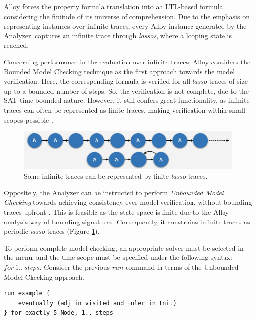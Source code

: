 Alloy forces the property formula translation into an LTL-based formula, considering the finitude of its universe of comprehension. Due to the emphasis on representing instances over infinite traces, every Alloy instance generated by the Analyzer, captures an infinite trace through \textit{lassos}, where a looping state is reached.

Concerning performance in the evaluation over infinite traces, Alloy considers the Bounded Model Checking technique as the first approach towards the model verification. Here, the corresponding formula is verified for all \textit{lasso} traces of size up to a bounded number of steps. So, the verification is not complete, due to the SAT time-bounded nature. However, it still confers great functionality, as infinite traces can often be represented as finite traces, making verification within small scopes possible \cite{jackson2012software}.

\begin{figure}[H]
    \centering
    \includegraphics[width=0.7\linewidth]{img/alloy_infinite_trace.png}
    \caption{Some infinite traces can be represented by finite \textit{lasso} traces.}
    \label{fig:alloy-infinite}
\end{figure}

Oppositely, the Analyzer can be instructed to perform \textit{Unbounded Model Checking} towards achieving consistency over model verification, without bounding traces upfront \cite{alloy-6, alloy-docs}. This is feasible as the state space is finite due to the Alloy analysis way of bounding signatures. Consequently, it constrains infinite traces as periodic \textit{lasso} traces (Figure \ref{fig:alloy-infinite}).

To perform complete model-checking, an appropriate solver must be selected in the  menu, and the time scope must be specified under the following syntax: $for\ 1..\ steps$. Consider the previous $run$ command in terms of the Unbounded Model Checking approach. 

\begin{lstlisting}[title={Unbounded Model Checking: Eventually the graph will represent an \textit{Eulerian} circuit.}, otherkeywords = {run, eventually, in, and, for, exactly, \5, steps}, floatplacement=H]
run example {
    eventually (adj in visited and Euler in Init)
} for exactly 5 Node, 1.. steps
\end{lstlisting}

